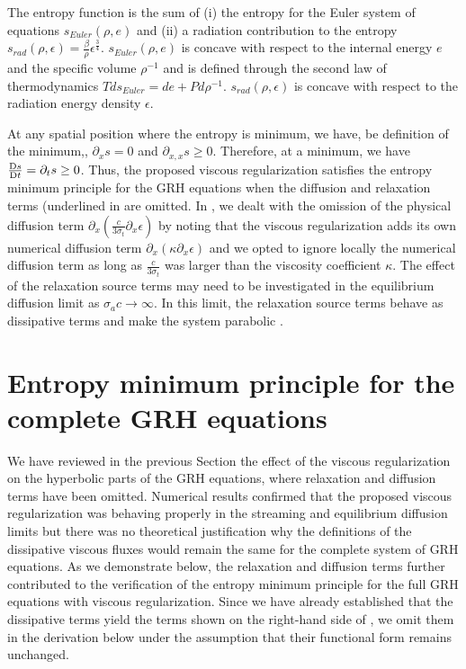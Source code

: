\documentclass{mc2015}
\begin{document}
%
The entropy function is the sum of (i) the entropy for the Euler system of equations $s_{Euler}(\rho, e)$ and (ii) a radiation contribution to the entropy $s_{rad}(\rho,\epsilon)=\tfrac{\beta}{\rho} \epsilon^\frac{3}{4}$. 
$s_{Euler}(\rho, e)$ is concave with respect to the internal energy $e$ and the specific volume $\rho^{-1}$ and is defined through the second law of thermodynamics $Tds_{Euler} = de + P d \rho^{-1}$. $s_{rad}(\rho,\epsilon)$ is concave with respect to the radiation energy density $\epsilon$. 
%

At any spatial position where the entropy is minimum, we have, be definition of the minimum,, $\partial_x s =0$ and $\partial_{x,x} s \geq 0$. Therefore, at a minimum, we have $\frac{\textrm{D} s}{\textrm{D} t}=\partial_t s \geq 0$. Thus, the proposed viscous regularization satisfies the entropy minimum principle for the GRH equations when the diffusion and relaxation terms (underlined in  are omitted. In \cite{our_jcp_radhy_paper}, we dealt with the omission of the physical diffusion term $\partial_x( \tfrac{c}{3 \sigma_t} \partial_x \epsilon)$ by noting that the viscous regularization adds its own numerical diffusion term $\partial_x \left( \kappa \partial_x \epsilon \right)$ and we opted to ignore
locally the numerical diffusion term as long as $\frac{c}{3 \sigma_t}$ was larger than the viscosity coefficient $\kappa$. 
%
The effect of the relaxation source terms may need to be investigated in the equilibrium diffusion limit as $\sigma_a c \to \infty$. In this limit, the relaxation source terms behave as dissipative terms and make the system parabolic \cite{Leveque}. 



\section{Entropy minimum principle for the complete GRH equations}\label{sec:VR_new}

We have reviewed in the previous Section the effect of the viscous regularization on the hyperbolic parts of the GRH equations, where relaxation and diffusion terms have been omitted. Numerical results confirmed that the proposed viscous regularization was behaving properly in the streaming and equilibrium diffusion limits but there was no theoretical justification why the definitions of the dissipative viscous fluxes would remain the same for the complete system of GRH equations. As we demonstrate below, the relaxation and diffusion terms further contributed to the verification of the entropy minimum principle for the full GRH equations with viscous regularization. Since we have already established that the dissipative terms yield the terms shown on the right-hand side of , we omit them in the derivation below under the assumption that their functional form remains unchanged.
\end{document}
